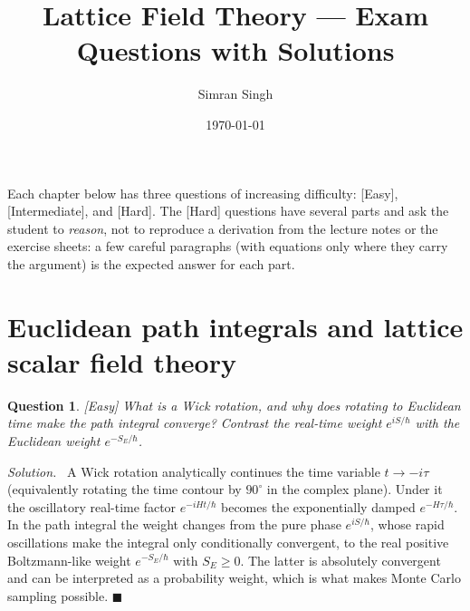 \documentclass[11pt]{article}
\title{Lattice Field Theory — Exam Questions with Solutions}
\author{Simran Singh}
\date{\today}
\newcommand{\diff}[1]{\textcolor{blue!60!black}{\footnotesize\textsf{[#1]}}\quad}
\newtheorem{question}{Question}
\newenvironment{solution}{\par\smallskip\noindent\textit{Solution.}\ }{\hfill$\blacksquare$\par\smallskip}
\begin{document}
\maketitle

\noindent Each chapter below has three questions of increasing difficulty:
\textcolor{blue!60!black}{\textsf{[Easy]}}, \textcolor{blue!60!black}{\textsf{[Intermediate]}}, and \textcolor{blue!60!black}{\textsf{[Hard]}}.
The \textcolor{blue!60!black}{\textsf{[Hard]}} questions have several parts and ask the student to \emph{reason}, not to reproduce a
derivation from the lecture notes or the exercise sheets: a few careful paragraphs (with equations only where they
carry the argument) is the expected answer for each part.

\section{Euclidean path integrals and lattice scalar field theory}

\begin{question}
\diff{Easy} What is a Wick rotation, and why does rotating to Euclidean time make the path integral converge? Contrast the real-time weight $e^{iS/\hbar}$ with the Euclidean weight $e^{-S_E/\hbar}$.
\end{question}
\begin{solution}
A Wick rotation analytically continues the time variable $t \to -i\tau$ (equivalently rotating the time contour by $90^\circ$ in the complex plane). Under it the oscillatory real-time factor $e^{-iHt/\hbar}$ becomes the exponentially damped $e^{-H\tau/\hbar}$. In the path integral the weight changes from the pure phase $e^{iS/\hbar}$, whose rapid oscillations make the integral only conditionally convergent, to the real positive Boltzmann-like weight $e^{-S_E/\hbar}$ with $S_E \ge 0$. The latter is absolutely convergent and can be interpreted as a probability weight, which is what makes Monte Carlo sampling possible.
\end{solution}
\end{document}
